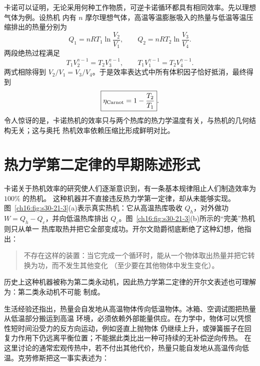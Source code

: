 {卡诺可以证明，无论采用何种工作物质，可逆卡诺循环都具有相同效率。先以理想气体为例。设热机
内有 $n$ 摩尔理想气体，高温等温膨胀吸入的热量与低温等温压缩排出的热量分别为
\[
  Q_1=nRT_1\ln\frac{V_2}{V_1},
  \qquad
  Q_2=nRT_2\ln\frac{V_3}{V_4}.
\]
两段绝热过程满足
\[
  T_1V_2^{\gamma-1}=T_2V_3^{\gamma-1},
  \qquad
  T_1V_1^{\gamma-1}=T_2V_4^{\gamma-1}.
\]
两式相除得到 $V_2/V_1=V_3/V_4$。于是效率表达式中所有体积因子恰好抵消，最终得到
\begin{equation}
  \boxed{\eta_{\rm Carnot}=1-\frac{T_2}{T_1}}.
\end{equation}
令人惊讶的是，卡诺热机的效率只与两个热库的热力学温度有关，与热机的几何结构无关；这与奥托
热机效率依赖压缩比形成鲜明对比。

\section{热力学第二定律的早期陈述形式}

卡诺关于热机效率的研究使人们逐渐意识到，有一条基本规律阻止人们制造效率为 $100\%$ 的热机。
这种机器并不直接违反热力学第一定律，却从未能够实现。图~\ref{ch16:fig:s30-21-3}(a)表示真实热机：它从高温热库吸收
$Q_h$，对外做功 $W=Q_h-Q_c$，并向低温热库排出 $Q_c$。图~\ref{ch16:fig:s30-21-3}(b)所示的“完美”热机则只从单一
热库取热并把它全部变成功。开尔文勋爵彻底断绝了这种幻想，他指出：

\begin{quote}\small
不存在这样的装置：当它完成一个循环时，能从一个物体取出热量并把它转换为功，而不发生其他变化
（至少要在其他物体中发生变化）。
\end{quote}

历史上这种机器被称为第二类永动机，因此热力学第二定律的开尔文表述也可理解为：第二类永动机不可能
制成。

\par\noindent\begin{minipage}{\linewidth}
\heatDevicesFigure
{}\label{ch16:fig:s30-21-3}
\end{minipage}\par\medskip

生活经验还指出，热量会自发地从高温物体传向低温物体。冰箱、空调试图把热量从低温部分搬运到高温
环境，必须依赖外部能量供应。在力学中，物体可以凭惯性短时间沿受力的反方向运动，例如竖直上抛物体
仍继续上升，或弹簧振子在回复力作用下仍远离平衡位置；不能据此类比出一种可持续的无补偿逆向传热。
在这里讨论的通常宏观传热中，若不付出其他代价，热量只能自发地从高温传向低温。克劳修斯把这一事实表述为：

}
